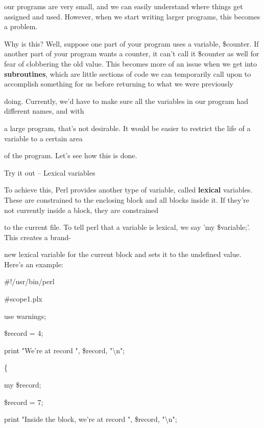 \documentclass[a4paper,11pt]{book}
\begin{document}
\noindent our programs are very small, and we can easily understand where things get assigned and used. However, when we start writing larger programs, this becomes a problem.

\noindent 

\noindent Why is this? Well, suppose one part of your program uses a variable, \$counter. If another part of your program wants a counter, it can't call it \$counter as well for fear of clobbering the old value. This becomes more of an issue when we get into \textbf{subroutines}, which are little sections of code we can temporarily call upon to accomplish something for us before returning to what we were previously

\noindent doing. Currently, we'd have to make sure all the variables in our program had different names, and with

\noindent a large program, that's not desirable. It would be easier to restrict the life of a variable to a certain area

\noindent of the program. Let's see how this is done.

\noindent 

\noindent Try it out -- Lexical variables

\noindent To achieve this, Perl provides another type of variable, called \textbf{lexical }variables. These are constrained to the enclosing block and all blocks inside it. If they're not currently inside a block, they are constrained

\noindent to the current file. To tell perl that a variable is lexical, we say 'my \$variable;'. This creates a brand-

\noindent new lexical variable for the current block and sets it to the undefined value. Here's an example:

\noindent 

\noindent 

\noindent \#!/usr/bin/perl

\noindent \#scope1.plx

\noindent use warnings;

\noindent \$record = 4;

\noindent print "We're at record ", \$record, "\textbackslash n";

\noindent 

\noindent \{

\noindent my \$record;

\noindent \$record = 7;

\noindent print "Inside the block, we're at record ", \$record, "\textbackslash n";
\end{document}
